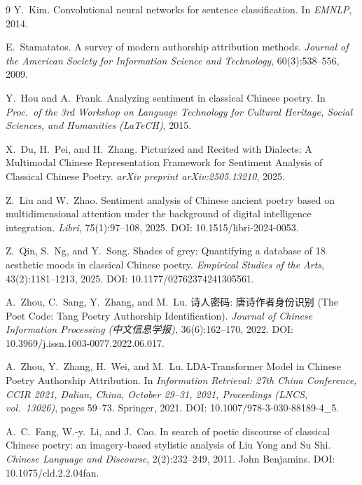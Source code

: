 \documentclass[10pt]{article}
\begin{document}

\begin{thebibliography}{9}
Y.~Kim.
\newblock Convolutional neural networks for sentence classification.
\newblock In \emph{EMNLP}, 2014.

E.~Stamatatos.
\newblock A survey of modern authorship attribution methods.
\newblock \emph{Journal of the American Society for Information Science
and Technology}, 60(3):538--556, 2009.

Y.~Hou and A.~Frank.
\newblock Analyzing sentiment in classical Chinese poetry.
\newblock In \emph{Proc.\ of the 3rd Workshop on Language Technology for
Cultural Heritage, Social Sciences, and Humanities (LaTeCH)}, 2015.

X.~Du, H.~Pei, and H.~Zhang.
\newblock Picturized and Recited with Dialects: A Multimodal Chinese
Representation Framework for Sentiment Analysis of Classical Chinese
Poetry.
\newblock \emph{arXiv preprint arXiv:2505.13210}, 2025.

Z.~Liu and W.~Zhao.
\newblock Sentiment analysis of Chinese ancient poetry based on multidimensional
attention under the background of digital intelligence integration.
\newblock \emph{Libri}, 75(1):97--108, 2025. DOI: 10.1515/libri-2024-0053.

Z.~Qin, S.~Ng, and Y.~Song.
\newblock Shades of grey: Quantifying a database of 18 aesthetic moods in
classical Chinese poetry.
\newblock \emph{Empirical Studies of the Arts}, 43(2):1181--1213, 2025.
DOI: 10.1177/02762374241305561.

A.~Zhou, C.~Sang, Y.~Zhang, and M.~Lu.
\newblock 诗人密码: 唐诗作者身份识别 (The Poet Code: Tang Poetry Authorship
Identification).
\newblock \emph{Journal of Chinese Information Processing
(中文信息学报)}, 36(6):162--170, 2022. DOI: 10.3969/j.issn.1003-0077.2022.06.017.

A.~Zhou, Y.~Zhang, H.~Wei, and M.~Lu.
\newblock LDA-Transformer Model in Chinese Poetry Authorship Attribution.
\newblock In \emph{Information Retrieval: 27th China Conference, CCIR 2021,
Dalian, China, October 29--31, 2021, Proceedings (LNCS, vol.~13026)}, pages
59--73. Springer, 2021. DOI: 10.1007/978-3-030-88189-4\_5.

A.~C.~Fang, W.-y.~Li, and J.~Cao.
\newblock In search of poetic discourse of classical Chinese poetry: an
  imagery-based stylistic analysis of Liu Yong and Su Shi.
\newblock \emph{Chinese Language and Discourse}, 2(2):232--249, 2011.
  John Benjamins. DOI: 10.1075/cld.2.2.04fan.


\end{thebibliography}
\end{document}
